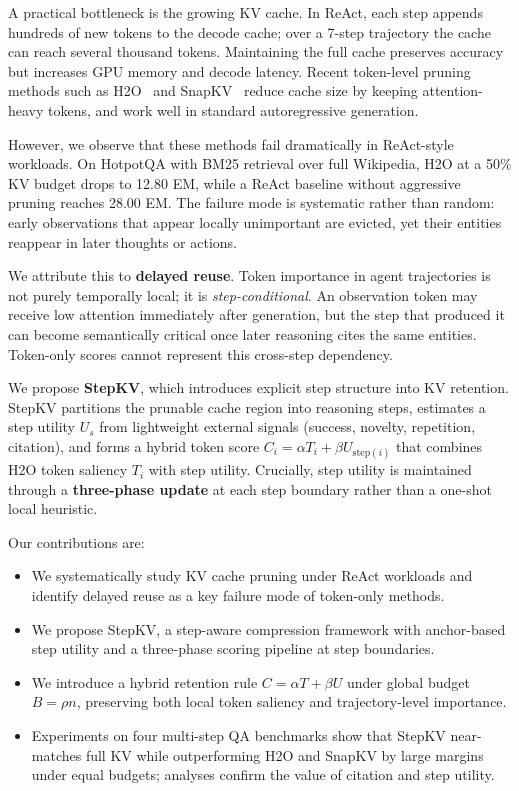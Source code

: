 \documentclass[11pt]{article}
\begin{document}
A practical bottleneck is the growing KV cache.
In ReAct, each step appends hundreds of new tokens to the decode cache; over a 7-step trajectory the cache can reach several thousand tokens.
Maintaining the full cache preserves accuracy but increases GPU memory and decode latency.
Recent token-level pruning methods such as H2O~\cite{zhang2023h2o} and SnapKV~\cite{li2024snapkv} reduce cache size by keeping attention-heavy tokens, and work well in standard autoregressive generation.

However, we observe that these methods fail dramatically in ReAct-style workloads.
On HotpotQA with BM25 retrieval over full Wikipedia, H2O at a 50\% KV budget drops to 12.80 EM, while a ReAct baseline without aggressive pruning reaches 28.00 EM.
The failure mode is systematic rather than random: early observations that appear locally unimportant are evicted, yet their entities reappear in later thoughts or actions.

We attribute this to \textbf{delayed reuse}.
Token importance in agent trajectories is not purely temporally local; it is \emph{step-conditional}.
An observation token may receive low attention immediately after generation, but the step that produced it can become semantically critical once later reasoning cites the same entities.
Token-only scores cannot represent this cross-step dependency.

We propose \textbf{StepKV}, which introduces explicit step structure into KV retention.
StepKV partitions the prunable cache region into reasoning steps, estimates a step utility $U_s$ from lightweight external signals (success, novelty, repetition, citation), and forms a hybrid token score $C_i=\alpha T_i+\beta U_{\mathrm{step}(i)}$ that combines H2O token saliency $T_i$ with step utility.
Crucially, step utility is maintained through a \textbf{three-phase update} at each step boundary rather than a one-shot local heuristic.

Our contributions are:
\begin{itemize}
    \item We systematically study KV cache pruning under ReAct workloads and identify delayed reuse as a key failure mode of token-only methods.
    \item We propose StepKV, a step-aware compression framework with anchor-based step utility and a three-phase scoring pipeline at step boundaries.
    \item We introduce a hybrid retention rule $C=\alpha T+\beta U$ under global budget $B=\rho n$, preserving both local token saliency and trajectory-level importance.
    \item Experiments on four multi-step QA benchmarks show that StepKV near-matches full KV while outperforming H2O and SnapKV by large margins under equal budgets; analyses confirm the value of citation and step utility.
\end{itemize}
\end{document}
